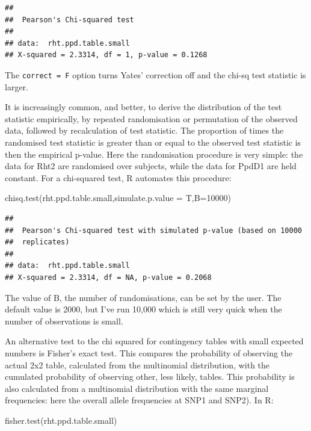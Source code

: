 \documentclass[
]{book}
\newenvironment{Shaded}{\begin{snugshade}}{\end{snugshade}}
\newcommand{\AttributeTok}[1]{\textcolor[rgb]{0.77,0.63,0.00}{#1}}
\newcommand{\DecValTok}[1]{\textcolor[rgb]{0.00,0.00,0.81}{#1}}
\newcommand{\FunctionTok}[1]{\textcolor[rgb]{0.00,0.00,0.00}{#1}}
\newcommand{\NormalTok}[1]{#1}
\begin{document}
\begin{verbatim}
## 
##  Pearson's Chi-squared test
## 
## data:  rht.ppd.table.small
## X-squared = 2.3314, df = 1, p-value = 0.1268
\end{verbatim}

The \texttt{correct\ =\ F} option turns Yates' correction off and the chi-sq test statistic is larger.

It is increasingly common, and better, to derive the distribution of the test statistic empirically, by repeated randomisation or permutation of the observed data, followed by recalculation of test statistic. The proportion of times the randomised test statistic is greater than or equal to the observed test statistic is then the empirical p-value. Here the randomisation procedure is very simple: the data for Rht2 are randomised over subjects, while the data for PpdD1 are held constant. For a chi-squared test, R automates this procedure:

\begin{Shaded}
\begin{Highlighting}[]
\FunctionTok{chisq.test}\NormalTok{(rht.ppd.table.small,}\AttributeTok{simulate.p.value =}\NormalTok{ T,}\AttributeTok{B=}\DecValTok{10000}\NormalTok{)}
\end{Highlighting}
\end{Shaded}

\begin{verbatim}
## 
##  Pearson's Chi-squared test with simulated p-value (based on 10000
##  replicates)
## 
## data:  rht.ppd.table.small
## X-squared = 2.3314, df = NA, p-value = 0.2068
\end{verbatim}

The value of B, the number of randomisations, can be set by the user. The default value is 2000, but I've run 10,000 which is still very quick when the number of observations is small.

An alternative test to the chi squared for contingency tables with small expected numbers is Fisher's exact test. This compares the probability of observing the actual 2x2 table, calculated from the multinomial distribution, with the cumulated probability of observing other, less likely, tables. This probability is also calculated from a multinomial distribution with the same marginal frequencies: here the overall allele frequencies at SNP1 and SNP2). In R:

\begin{Shaded}
\begin{Highlighting}[]
\FunctionTok{fisher.test}\NormalTok{(rht.ppd.table.small)}
\end{Highlighting}
\end{Shaded}
\end{document}
